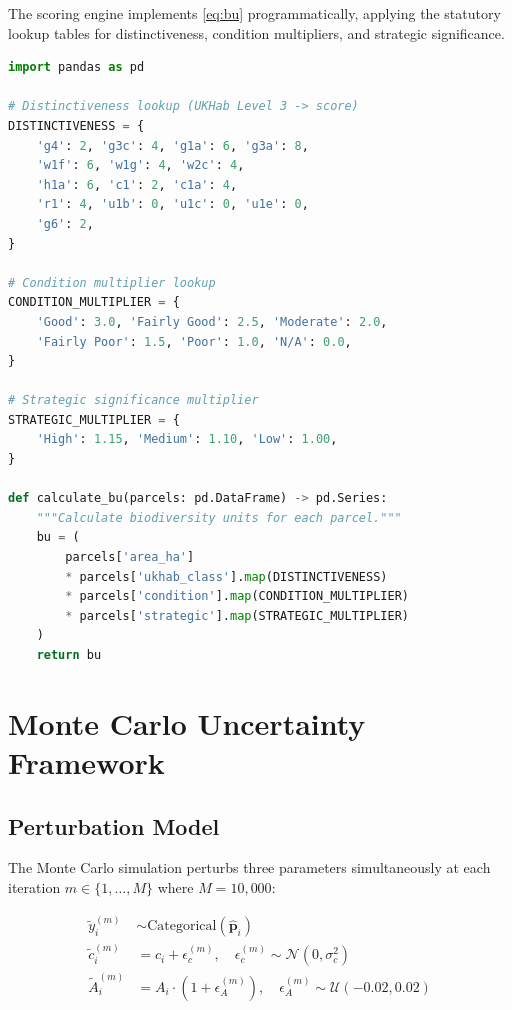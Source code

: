 The scoring engine implements \cref{eq:bu} programmatically, applying the statutory lookup tables for distinctiveness, condition multipliers, and strategic significance.

\begin{lstlisting}[language=Python,caption={BM\,4.0 biodiversity unit calculation.},label={lst:bu-calc}]
import pandas as pd

# Distinctiveness lookup (UKHab Level 3 -> score)
DISTINCTIVENESS = {
    'g4': 2, 'g3c': 4, 'g1a': 6, 'g3a': 8,
    'w1f': 6, 'w1g': 4, 'w2c': 4,
    'h1a': 6, 'c1': 2, 'c1a': 4,
    'r1': 4, 'u1b': 0, 'u1c': 0, 'u1e': 0,
    'g6': 2,
}

# Condition multiplier lookup
CONDITION_MULTIPLIER = {
    'Good': 3.0, 'Fairly Good': 2.5, 'Moderate': 2.0,
    'Fairly Poor': 1.5, 'Poor': 1.0, 'N/A': 0.0,
}

# Strategic significance multiplier
STRATEGIC_MULTIPLIER = {
    'High': 1.15, 'Medium': 1.10, 'Low': 1.00,
}

def calculate_bu(parcels: pd.DataFrame) -> pd.Series:
    """Calculate biodiversity units for each parcel."""
    bu = (
        parcels['area_ha']
        * parcels['ukhab_class'].map(DISTINCTIVENESS)
        * parcels['condition'].map(CONDITION_MULTIPLIER)
        * parcels['strategic'].map(STRATEGIC_MULTIPLIER)
    )
    return bu
\end{lstlisting}


\section{Monte Carlo Uncertainty Framework}

\subsection{Perturbation Model}

The Monte Carlo simulation perturbs three parameters simultaneously at each iteration $m \in \{1, \ldots, M\}$ where $M = 10{,}000$:

\begin{align}
\tilde{y}_i^{(m)} &\sim \text{Categorical}\!\left(\hat{\mathbf{p}}_i\right) \label{eq:mc-class} \\
\tilde{c}_i^{(m)} &= c_i + \epsilon_{c}^{(m)}, \quad \epsilon_{c}^{(m)} \sim \mathcal{N}(0, \sigma_c^2) \label{eq:mc-cond} \\
\tilde{A}_i^{(m)} &= A_i \cdot (1 + \epsilon_{A}^{(m)}), \quad \epsilon_{A}^{(m)} \sim \mathcal{U}(-0.02, 0.02) \label{eq:mc-area}
\end{align}

